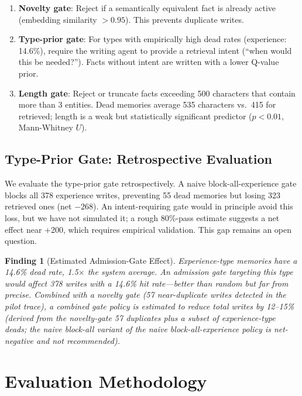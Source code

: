 \documentclass{llncs}
\newtheorem{finding}{Finding}
\begin{document}
\begin{enumerate}
\item \textbf{Novelty gate}: Reject if a semantically equivalent fact is already active (embedding similarity $> 0.95$). This prevents duplicate writes.
\item \textbf{Type-prior gate}: For types with empirically high dead rates (experience: 14.6\%), require the writing agent to provide a retrieval intent (``when would this be needed?''). Facts without intent are written with a lower Q-value prior.
\item \textbf{Length gate}: Reject or truncate facts exceeding 500 characters that contain more than 3 entities. Dead memories average 535 characters vs.\ 415 for retrieved; length is a weak but statistically significant predictor ($p < 0.01$, Mann-Whitney $U$).
\end{enumerate}

\subsection{Type-Prior Gate: Retrospective Evaluation}

We evaluate the type-prior gate retrospectively. A naive block-all-experience gate blocks all 378 experience writes, preventing 55 dead memories but losing 323 retrieved ones (net $-268$). An intent-requiring gate would in principle avoid this loss, but we have not simulated it; a rough 80\%-pass estimate suggests a net effect near +200, which requires empirical validation. This gap remains an open question.



\begin{finding}[Estimated Admission-Gate Effect]
Experience-type memories have a 14.6\% dead rate, 1.5$\times$ the system average. An admission gate targeting this type would affect 378 writes with a 14.6\% hit rate---better than random but far from precise. Combined with a novelty gate (57 near-duplicate writes detected in the pilot trace), a combined gate policy is \emph{estimated} to reduce total writes by 12--15\% (derived from the novelty-gate 57 duplicates plus a subset of experience-type deads; the naive block-all variant of the naive block-all-experience policy is net-negative and not recommended).
\end{finding}

\section{Evaluation Methodology}
\end{document}
